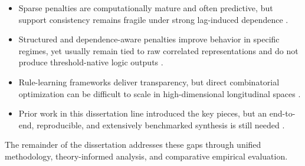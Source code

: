 \begin{itemize}
  \item Sparse penalties are computationally mature and often predictive, but support consistency remains fragile under strong lag-induced dependence \autocites{PZhao2006model,freijeirogonzalez2022}.
  \item Structured and dependence-aware penalties improve behavior in specific regimes, yet usually remain tied to raw correlated representations and do not produce threshold-native logic outputs \autocites{RTibshirani2016ordered,HZhu2021variable,yuan2006}.
  \item Rule-learning frameworks deliver transparency, but direct combinatorial optimization can be difficult to scale in high-dimensional longitudinal spaces \autocites{EBoros1997Logical,EAngelino2018Learning}.
  \item Prior work in this dissertation line introduced the key pieces, but an end-to-end, reproducible, and extensively benchmarked synthesis is still needed \autocites{orender2022,JOrender2025Efficient,JOrender2025Anytime}.
\end{itemize}

The remainder of the dissertation addresses these gaps through unified methodology, theory-informed analysis, and comparative empirical evaluation.
